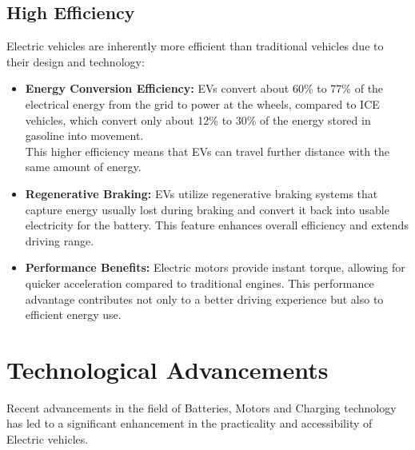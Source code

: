 \documentclass[a4paper,12pt]{report}
\begin{document}
\subsection{High Efficiency }
Electric vehicles are inherently more efficient than traditional vehicles due to their design and technology:
\begin{itemize}
    \item \textbf{Energy Conversion Efficiency: }
    EVs convert about 60\% to 77\% of the electrical energy from the grid to power at the wheels, compared to ICE vehicles, which convert only about 12\% to 30\% of the energy stored in gasoline into movement.
    \\ This higher efficiency means that EVs can travel further distance with the same amount of energy.
    \item \textbf{Regenerative Braking: }EVs utilize regenerative braking systems that capture energy usually lost during braking and convert it back into usable electricity for the battery. This feature enhances overall efficiency and extends driving range.
    \item \textbf{Performance Benefits: }Electric motors provide instant torque, allowing for quicker acceleration compared to traditional engines. This performance advantage contributes not only to a better driving experience but also to efficient energy use.
    \end{itemize}

\section{Technological Advancements}
Recent advancements in the field of Batteries, Motors and Charging technology has led to a significant enhancement in the practicality and accessibility of Electric vehicles. 
\end{document}
